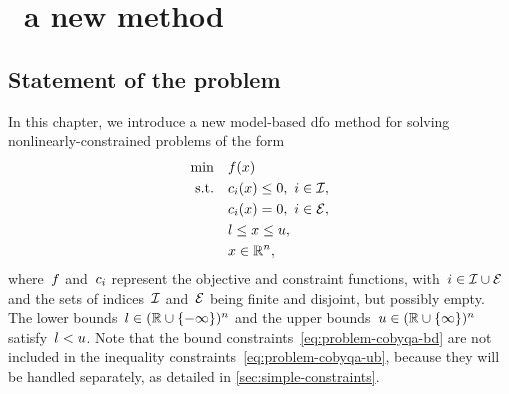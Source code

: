 %
%
%
\chapter{ \textemdash\ a new  method}
\label{ch:cobyqa-introduction}

\section{Statement of the problem}

In this chapter, we introduce a new model-based \gls{dfo} method for solving nonlinearly-constrained problems of the form
\begin{subequations}
    \label{eq:problem-cobyqa}
    \begin{align}
        \min        & \quad \obj(\iter) \label{eq:problem-cobyqa-obj}\\
        \text{s.t.} & \quad \con{i}(\iter) \le 0, ~ i \in \iub, \label{eq:problem-cobyqa-ub}\\
                    & \quad \con{i}(\iter) = 0, ~ i \in \ieq, \label{eq:problem-cobyqa-eq}\\
                    & \quad \xl \le x \le \xu, \label{eq:problem-cobyqa-bd}\\
                    & \quad \iter \in \R^n, \nonumber
    \end{align}
\end{subequations}
where~$f$ and~$c_{i}$ represent the objective and constraint functions, with~$i \in \mathcal{I} \cup \mathcal{E}$ and the sets of indices~$\mathcal{I}$ and~$\mathcal{E}$ being finite and disjoint, but possibly empty. 
The lower bounds~$l \in (\mathbb{R} \cup \{-\infty\})^n$ and the upper bounds~$u \in (\mathbb{R} \cup \{\infty\})^n$ satisfy~$l < u$.
Note that the bound constraints~\cref{eq:problem-cobyqa-bd} are not included in the inequality constraints~\cref{eq:problem-cobyqa-ub}, because they will be handled separately, as detailed in \cref{sec:simple-constraints}.

